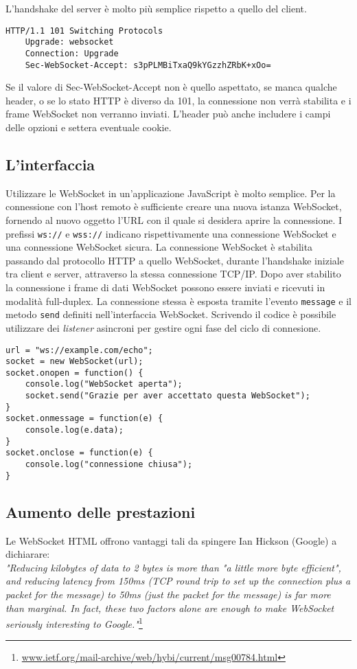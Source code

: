 L'handshake del server è molto più semplice rispetto a quello del client.

\begin{lstlisting}[caption={server handshake}, style=javaScriptCode]
	HTTP/1.1 101 Switching Protocols
	Upgrade: websocket
	Connection: Upgrade
	Sec-WebSocket-Accept: s3pPLMBiTxaQ9kYGzzhZRbK+xOo=
\end{lstlisting} 
\label{sec:serv_handshake}

Se il valore di Sec-WebSocket-Accept non è quello aspettato, se manca qualche header, o se lo stato HTTP è diverso da 101, la connessione non verrà stabilita e i frame WebSocket non verranno inviati.
L'header può anche includere i campi delle opzioni e settera eventuale cookie.
 
\subsection{L'interfaccia}
Utilizzare le WebSocket in un'applicazione JavaScript è molto semplice.
Per la connessione con l'host remoto è sufficiente creare una nuova istanza WebSocket, fornendo al nuovo oggetto l'URL con il quale si desidera aprire la connessione.
I prefissi \texttt{ws://} e \texttt{wss://} indicano rispettivamente una connessione WebSocket e una connessione WebSocket sicura.
La connessione WebSocket è stabilita passando dal protocollo HTTP a quello WebSocket, durante l'handshake iniziale tra client e server, attraverso la stessa connessione TCP/IP. Dopo aver stabilito la connessione i frame di dati WebSocket possono essere inviati e ricevuti in modalità full-duplex.
La connessione stessa è esposta tramite l'evento \texttt{message} e il metodo \texttt{send} definiti nell'interfaccia WebSocket.
Scrivendo il codice è possibile utilizzare dei \emph{listener} asincroni per gestire ogni fase del ciclo di connesione.
\begin{lstlisting}[caption={interfaccia WebSocket}, style=javaScriptCode]
url = "ws://example.com/echo";
socket = new WebSocket(url);
socket.onopen = function() {
	console.log("WebSocket aperta");
	socket.send("Grazie per aver accettato questa WebSocket");
}
socket.onmessage = function(e) {
	console.log(e.data);
}	
socket.onclose = function(e) {
	console.log("connessione chiusa");
}
\end{lstlisting} 
\label{sec:interfaccia_websocket}
\subsection{Aumento delle prestazioni}
Le WebSocket HTML offrono vantaggi tali da spingere Ian Hickson (Google) a dichiarare: \\
\textit{"Reducing kilobytes of data to 2 bytes is more than "a little more byte efficient", 
and reducing latency from 150ms (TCP round trip to set up the 
connection plus a packet for the message) to 50ms (just the packet for the 
message) is far more than marginal. 
In fact, these two factors alone are enough to make WebSocket seriously interesting to Google."}\footnote{\url{www.ietf.org/mail-archive/web/hybi/current/msg00784.html}}
  
